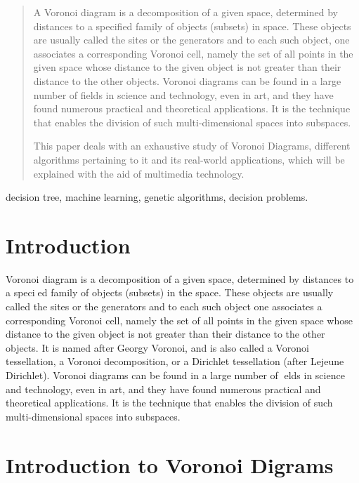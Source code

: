 \documentclass[conference]{IEEEtran}
\begin{document}
\begin{abstract}
A Voronoi diagram is a decomposition of a given space, determined by distances to a speciﬁed family of
objects (subsets) in space. These objects are usually called the sites or the generators and to each such object, one associates a corresponding
Voronoi cell, namely the set of all points in the given space whose distance to the given object is not greater than their distance to the other objects. Voronoi diagrams can be found in a large number of ﬁelds in science and technology, even in art, and they have found numerous practical and theoretical
applications. It is the technique that enables the division of such multi-dimensional spaces into
subspaces.



This paper deals with an exhaustive study of Voronoi Diagrams, different algorithms pertaining to it and
its real-world applications, which will be explained with the aid of multimedia technology.

\end{abstract}
\begin{keywords}
decision tree, machine learning, genetic algorithms, decision problems.
\end{keywords}

\IEEEpeerreviewmaketitle



\section{Introduction}
Voronoi diagram is a decomposition of a given space, determined by distances to a
specied family of objects (subsets) in the space. These objects are usually called
the sites or the generators and to each such object one associates a corresponding
Voronoi cell, namely the set of all points in the given space whose distance to the
given object is not greater than their distance to the other objects. It is named after
Georgy Voronoi, and is also called a Voronoi tessellation, a Voronoi decomposition,
or a Dirichlet tessellation (after Lejeune Dirichlet). Voronoi diagrams can be found
in a large number of elds in science and technology, even in art, and they have
found numerous practical and theoretical applications. It is the technique that
enables the division of such multi-dimensional spaces into subspaces.


\section{Introduction to Voronoi Digrams}
\end{document}
